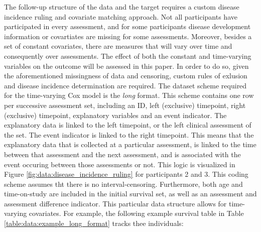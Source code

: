 The follow-up structure of the data and the target requires a custom disease incidence ruling and covariate matching approach. Not all participants have participated in every assessment, and for some participants disease development information or covartiates are missing for some assessments. Moreover, besides a set of constant covariates, there are measures that will vary over time and consequently over assessments. The effect of both the constant and time-varying variables on the outcome will be assessed in this paper. In order to do so, given the aforementioned missingness of data and censoring, custom rules of exlusion and disease incidence determination are required. The dataset scheme required for the time-varying Cox model is the \textit{long} format. This scheme contains one row per successive assessment set, including an ID, left (exclusive) timepoint, right (exclusive) timepoint, explanatory variables and an event indicator. The explanatory data is linked to the left timepoint, or the left clinical assessment of the set. The event indicator is linked to the right timepoint. This means that the explanatory data that is collected at a particular assessment, is linked to the time between that assessment and the next assessment, and is associated with the event occuring between those assessments or not. This logic is visualized in Figure \ref{fig:data:disease_incidence_ruling} for participants 2 and 3. This coding scheme assumes tht there is no interval-censoring. Furthermore, both age and time-on-study are included in the initial survival set, as well as an assessment and assessment difference indicator. This particular data structure allows for time-varying covariates. For example, the following example survival table in Table \ref{table:data:example_long_format} tracks thee individuals:
\vspace{0.5cm}
